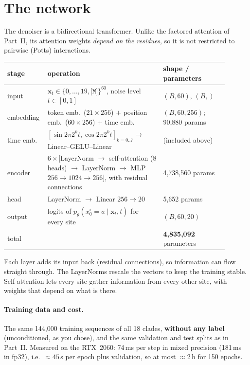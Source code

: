 \section{The network}\label{sec:md_network}
The denoiser is a bidirectional transformer. Unlike the factored attention of Part~II, its attention weights
\emph{depend on the residues}, so it is not restricted to pairwise (Potts) interactions.
\begin{center}\footnotesize
\begin{tabular}{p{0.12\linewidth}p{0.5\linewidth}p{0.28\linewidth}}
\toprule
stage & operation & shape / parameters\\
\midrule
input & $\bm x_t\in\{0,\dots,19,\texttt{[M]}\}^{60}$, noise level $t\in[0,1]$ & $(B,60)$, $(B,)$\\
embedding & token emb.\ ($21\times256$) $+$ position emb.\ ($60\times256$) $+$ time emb. & $(B,60,256)$; 90{,}880 params\\
time emb. & $[\sin2\pi2^kt,\cos2\pi2^kt]_{k=0..7}\to$ Linear--GELU--Linear & (included above)\\
encoder & $6\times$[LayerNorm $\to$ self-attention (8 heads) $\to$ LayerNorm $\to$ MLP $256{\to}1024{\to}256$], with residual connections & 4{,}738{,}560 params\\
head & LayerNorm $\to$ Linear $256\to20$ & 5{,}652 params\\
output & logits of $p_\theta(x^i_0=a\mid\bm x_t,t)$ for every site & $(B,60,20)$\\
\midrule
total & & \textbf{4{,}835{,}092} parameters\\
\bottomrule
\end{tabular}
\end{center}
Each layer adds its input back (residual connections), so information can flow straight through. The LayerNorms
rescale the vectors to keep the training stable. Self-attention lets every site gather information from every
other site, with weights that depend on what is there.

\paragraph{Training data and cost.} The same 144{,}000 training sequences of all 18 clades, \textbf{without any label}
(unconditioned, as you chose), and the same validation and test splits as in Part~II. Measured on the RTX~2060:
74\,ms per step in mixed precision (181\,ms in fp32), i.e.\ $\approx45$\,s per epoch plus validation, so at most
$\approx2$\,h for 150 epochs.

